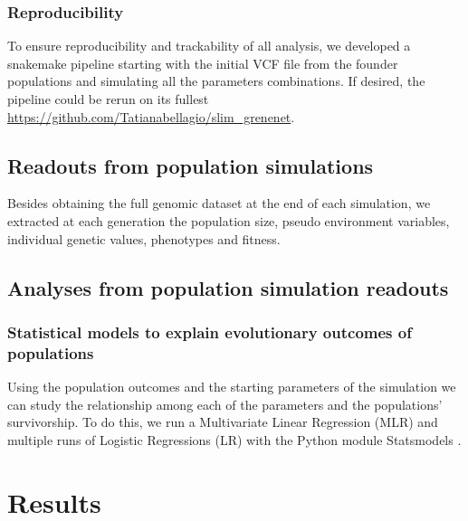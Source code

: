\documentclass{article}
\begin{document}
\subsubsection{Reproducibility}
To ensure reproducibility and trackability of all analysis, we developed a snakemake pipeline \citep{Molder2021-ho}  starting with the initial VCF file from the founder populations and simulating all the parameters combinations. If desired, the pipeline could be rerun on its fullest \url{https://github.com/Tatianabellagio/slim_grenenet}.

\subsection{Readouts from population simulations}
Besides obtaining the full genomic dataset at the end of each simulation,  we extracted at each generation the population size, pseudo environment variables, individual genetic values, phenotypes and fitness. 

\subsection{Analyses from population simulation readouts}
\subsubsection{Statistical models to explain evolutionary outcomes of populations}
Using the population outcomes and the starting parameters of the simulation we can study the relationship among each of the parameters and the populations' survivorship. To do this, we run a Multivariate Linear Regression (MLR) and multiple runs of Logistic Regressions (LR) with the Python module Statsmodels \citep{Seabold2010-ec}. 

\section{Results}
\end{document}
